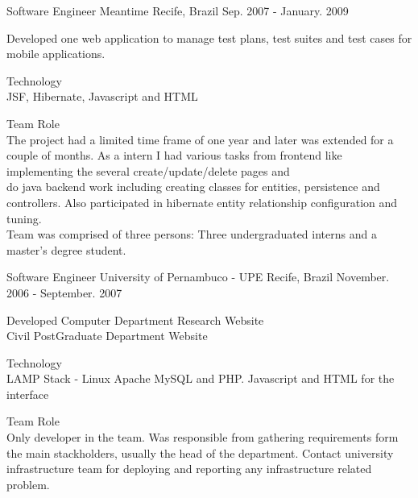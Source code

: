 \begin{cventries}
  \cventry
    {Software Engineer} %
    {Meantime} %
    {Recife, Brazil} %
    {Sep. 2007 - January. 2009} %
    {
      \begin{cvitems} %
\item{Developed one web application to manage test plans, test suites and test cases for mobile applications.
}
\item{Technology\\
JSF, Hibernate, Javascript and HTML
}
\item{Team Role\\
The project had a limited time frame of one year and later was extended for a couple of months. As a intern I had various tasks from frontend like implementing the several create/update/delete pages and\\
do java backend work including creating classes for entities, persistence and controllers. Also participated in hibernate entity relationship configuration and tuning.\\
Team was comprised of three persons: Three undergraduated interns and a master's degree student.}
      \end{cvitems}
    }

  \cventry
    {Software Engineer} %
    {University of Pernambuco - UPE} %
    {Recife, Brazil} %
    {November. 2006 - September. 2007} %
    {
      \begin{cvitems} %
\item{Developed Computer Department Research Website\\
Civil PostGraduate Department Website\\
}
\item{Technology\\
LAMP Stack - Linux Apache MySQL and PHP. Javascript and HTML for the interface\\
}
\item{Team Role\\
Only developer in the team. Was responsible from gathering requirements form the main stackholders, usually the head of the department. Contact university infrastructure team for deploying and reporting any infrastructure related problem.\\
}
      \end{cvitems}
    }
\end{cventries}